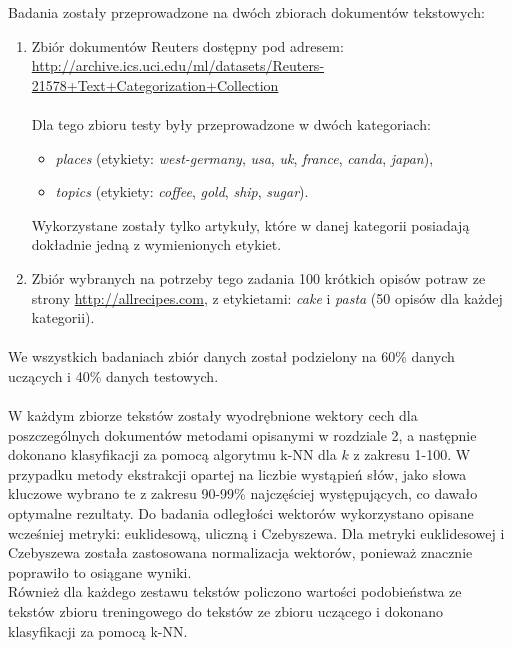 \documentclass{classrep}
\begin{document}
{\color{blue} 
Badania zostały przeprowadzone na dwóch zbiorach dokumentów tekstowych:\\
\begin{enumerate}
\item Zbiór dokumentów Reuters dostępny pod adresem:\\ \url{http://archive.ics.uci.edu/ml/datasets/Reuters-21578+Text+Categorization+Collection}\\\\
Dla tego zbioru testy były przeprowadzone w dwóch kategoriach:

\begin{itemize}
\item \textit{places} (etykiety: \textit{west-germany}, \textit{usa}, \textit{uk}, \textit{france}, \textit{canda}, \textit{japan}),
\item \textit{topics} (etykiety: \textit{coffee}, \textit{gold}, \textit{ship}, \textit{sugar}).\\
\end{itemize}
Wykorzystane zostały tylko artykuły, które w danej kategorii posiadają dokładnie jedną z wymienionych etykiet.\\


\item Zbiór wybranych na potrzeby tego zadania 100 krótkich opisów potraw ze strony \url{http://allrecipes.com}, z etykietami: \textit{cake} i \textit{pasta} (50 opisów dla każdej kategorii).

\end{enumerate}

\paragraph{}
We wszystkich badaniach zbiór danych został podzielony na 60\% danych uczących i 40\% danych testowych.
\paragraph{}
W każdym zbiorze tekstów zostały wyodrębnione wektory cech dla poszczególnych dokumentów metodami opisanymi w rozdziale 2, a następnie dokonano klasyfikacji za pomocą algorytmu k-NN dla $k$ z zakresu 1-100. W przypadku metody ekstrakcji opartej na liczbie wystąpień słów, jako słowa kluczowe wybrano te z zakresu 90-99\% najczęściej występujących, co dawało optymalne rezultaty.
Do badania odległości wektorów wykorzystano opisane wcześniej metryki: euklidesową, uliczną i Czebyszewa. Dla metryki euklidesowej i Czebyszewa została zastosowana normalizacja wektorów, ponieważ znacznie poprawiło to osiągane wyniki.\\
Również dla każdego zestawu tekstów policzono wartości podobieństwa ze tekstów zbioru treningowego do tekstów ze zbioru uczącego i dokonano klasyfikacji za pomocą k-NN.

}
\end{document}
